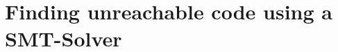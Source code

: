 \chapter{Finding unreachable code using a SMT-Solver}
\label{cha:finding unreachable code using a smt-solver}
